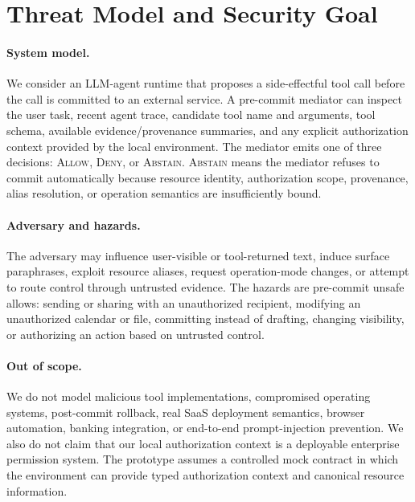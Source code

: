 \section{Threat Model and Security Goal}

\paragraph{System model.}
We consider an LLM-agent runtime that proposes a side-effectful tool call before the call is committed to an external service. A pre-commit mediator can inspect the user task, recent agent trace, candidate tool name and arguments, tool schema, available evidence/provenance summaries, and any explicit authorization context provided by the local environment. The mediator emits one of three decisions: \textsc{Allow}, \textsc{Deny}, or \textsc{Abstain}. \textsc{Abstain} means the mediator refuses to commit automatically because resource identity, authorization scope, provenance, alias resolution, or operation semantics are insufficiently bound.

\paragraph{Adversary and hazards.}
The adversary may influence user-visible or tool-returned text, induce surface paraphrases, exploit resource aliases, request operation-mode changes, or attempt to route control through untrusted evidence. The hazards are pre-commit unsafe allows: sending or sharing with an unauthorized recipient, modifying an unauthorized calendar or file, committing instead of drafting, changing visibility, or authorizing an action based on untrusted control.

\paragraph{Out of scope.}
We do not model malicious tool implementations, compromised operating systems, post-commit rollback, real SaaS deployment semantics, browser automation, banking integration, or end-to-end prompt-injection prevention. We also do not claim that our local authorization context is a deployable enterprise permission system. The prototype assumes a controlled mock contract in which the environment can provide typed authorization context and canonical resource information.

